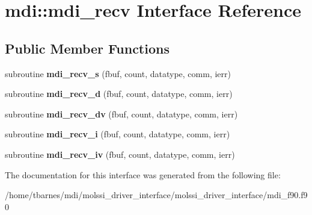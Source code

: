 \hypertarget{interfacemdi_1_1mdi__recv}{\section{mdi\-:\-:mdi\-\_\-recv Interface Reference}
\label{interfacemdi_1_1mdi__recv}
}
\subsection*{Public Member Functions}
\begin{DoxyCompactItemize}
\item 
\hypertarget{interfacemdi_1_1mdi__recv_a7311db44b9a07e51819c43cdb4a454bf}{subroutine {\bfseries mdi\-\_\-recv\-\_\-s} (fbuf, count, datatype, comm, ierr)}\label{interfacemdi_1_1mdi__recv_a7311db44b9a07e51819c43cdb4a454bf}

\item 
\hypertarget{interfacemdi_1_1mdi__recv_ac0a9b1a924c7106d0a574e15a5882291}{subroutine {\bfseries mdi\-\_\-recv\-\_\-d} (fbuf, count, datatype, comm, ierr)}\label{interfacemdi_1_1mdi__recv_ac0a9b1a924c7106d0a574e15a5882291}

\item 
\hypertarget{interfacemdi_1_1mdi__recv_ad5fc789a537ac5781f5d2590d7cd34d5}{subroutine {\bfseries mdi\-\_\-recv\-\_\-dv} (fbuf, count, datatype, comm, ierr)}\label{interfacemdi_1_1mdi__recv_ad5fc789a537ac5781f5d2590d7cd34d5}

\item 
\hypertarget{interfacemdi_1_1mdi__recv_a026f22dc4ed36c50764c7dc2cdfe9bd1}{subroutine {\bfseries mdi\-\_\-recv\-\_\-i} (fbuf, count, datatype, comm, ierr)}\label{interfacemdi_1_1mdi__recv_a026f22dc4ed36c50764c7dc2cdfe9bd1}

\item 
\hypertarget{interfacemdi_1_1mdi__recv_abe214d15e6c082d38999a36fb8d33fea}{subroutine {\bfseries mdi\-\_\-recv\-\_\-iv} (fbuf, count, datatype, comm, ierr)}\label{interfacemdi_1_1mdi__recv_abe214d15e6c082d38999a36fb8d33fea}

\end{DoxyCompactItemize}


The documentation for this interface was generated from the following file\-:\begin{DoxyCompactItemize}
\item 
/home/tbarnes/mdi/molssi\-\_\-driver\-\_\-interface/molssi\-\_\-driver\-\_\-interface/mdi\-\_\-f90.\-f90\end{DoxyCompactItemize}
